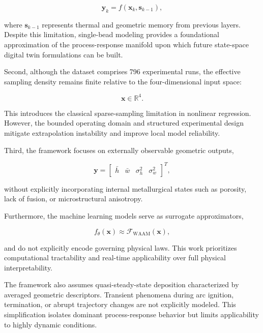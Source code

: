\documentclass[11pt]{article}
\begin{document}
\begin{equation}
\mathbf{y}_k = f(\mathbf{x}_k, \mathbf{s}_{k-1}),
\end{equation}

where $\mathbf{s}_{k-1}$ represents thermal and geometric memory from previous layers. Despite this limitation, single-bead modeling provides a foundational approximation of the process-response manifold upon which future state-space digital twin formulations can be built.

Second, although the dataset comprises 796 experimental runs, the effective sampling density remains finite relative to the four-dimensional input space:

\begin{equation}
\mathbf{x} \in \mathbb{R}^{4}.
\end{equation}

This introduces the classical sparse-sampling limitation in nonlinear regression. However, the bounded operating domain and structured experimental design mitigate extrapolation instability and improve local model reliability.

Third, the framework focuses on externally observable geometric outputs,

\begin{equation}
\mathbf{y} =
\begin{bmatrix}
\bar{h} & \bar{w} & \sigma_h^2 & \sigma_w^2
\end{bmatrix}^{T},
\end{equation}

without explicitly incorporating internal metallurgical states such as porosity, lack of fusion, or microstructural anisotropy. 

Furthermore, the machine learning models serve as surrogate approximators,

\begin{equation}
f_{\theta}(\mathbf{x}) \approx \mathcal{F}_{\mathrm{WAAM}}(\mathbf{x}),
\end{equation}

and do not explicitly encode governing physical laws. This work prioritizes computational tractability and real-time applicability over full physical interpretability.

The framework also assumes quasi-steady-state deposition characterized by averaged geometric descriptors. Transient phenomena during arc ignition, termination, or abrupt trajectory changes are not explicitly modeled. This simplification isolates dominant process-response behavior but limits applicability to highly dynamic conditions.
\end{document}
